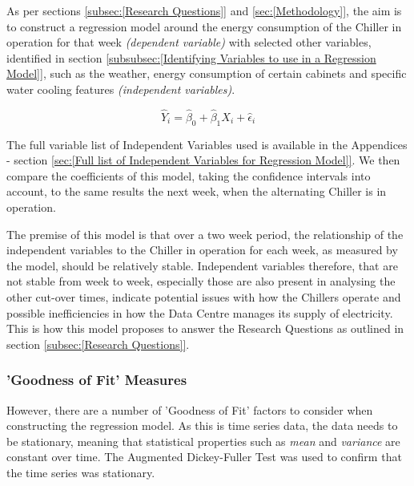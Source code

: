 \documentclass[12pt]{scrartcl}
\begin{document}
As per sections \ref{subsec:[Research Questions]} and \ref{sec:[Methodology]}, the aim is to construct a regression model around the energy consumption of the Chiller in operation for that week \textit{(dependent variable)} with selected other variables, identified in section \ref{subsubsec:[Identifying Variables to use in a Regression Model]}, such as the weather, energy consumption of certain cabinets and specific water cooling features \textit{(independent variables)}. 

\begin{equation}
\hat{Y}_i = \hat{\beta}_0 + \hat{\beta}_1 X_i + \hat{\epsilon}_i
\end{equation}

The full variable list of Independent Variables used is available in the Appendices - section \ref{sec:[Full list of Independent Variables for Regression Model]}. We then compare the coefficients of this model, taking the confidence intervals into account, to the same results the next week, when the alternating Chiller is in operation. 

The premise of this model is that over a two week period, the relationship of the independent variables to the Chiller in operation for each week, as measured by the model, should be relatively stable. Independent variables therefore, that are not stable from week to week, especially those are also present in analysing the other cut-over times, indicate potential issues with how the Chillers operate and possible inefficiencies in how the Data Centre manages its supply of electricity. This is how this model proposes to answer the Research Questions as outlined in section \ref{subsec:[Research Questions]}.  


\subsubsection{'Goodness of Fit' Measures}
\label{subsubsec:['Goodness of Fit' Measures]}
However, there are a number of 'Goodness of Fit' factors to consider when constructing the regression model. As this is time series data, the data needs to be stationary, meaning that statistical properties such as \textit{mean} and \textit{variance} are constant over time. The Augmented Dickey-Fuller Test was used to confirm that the time series was stationary.
\end{document}
